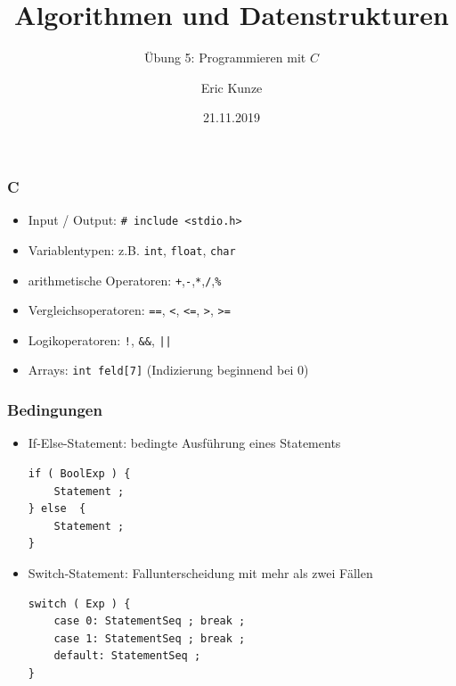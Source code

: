 \documentclass{beamer}
\begin{document}
	
	\title{Algorithmen und Datenstrukturen}
	\subtitle{Übung 5: Programmieren mit $C$}
	\author{Eric Kunze}
	\date{21.11.2019}

	\maketitle



\begin{frame}[fragile] \frametitle{C}
	\begin{itemize}
		\item Input / Output: \lstinline{# include <stdio.h>}
		\item Variablentypen: z.B. \texttt{int}, \texttt{float}, \texttt{char}
		\item arithmetische Operatoren: \texttt{+},\texttt{-},\texttt{*},\texttt{/},\texttt{\%}
		\item Vergleichsoperatoren: \texttt{==}, \texttt{<}, \texttt{<=}, \texttt{>}, \texttt{>=}
		\item Logikoperatoren: \texttt{!}, \texttt{\&\&}, \texttt{||}
		\item Arrays: \lstinline[basicstyle=\normalsize]|int feld[7]| (Indizierung beginnend bei 0)
	\end{itemize}
\end{frame}


\begin{frame}[fragile] \frametitle{Bedingungen}
	\begin{itemize}
		\item If-Else-Statement: bedingte Ausführung eines Statements
\begin{lstlisting}
if ( BoolExp ) {
	Statement ;
} else  {
	Statement ;
}
\end{lstlisting}
		\item Switch-Statement: Fallunterscheidung mit mehr als zwei Fällen
\begin{lstlisting}
switch ( Exp ) {
	case 0: StatementSeq ; break ;
	case 1: StatementSeq ; break ;
	default: StatementSeq ;
}
\end{lstlisting}
		
	\end{itemize}
\end{frame}
\end{document}
